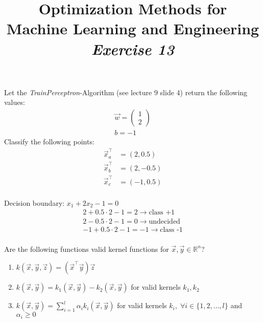 



\author{}
\date{}
\title{Optimization Methods for \\Machine Learning and Engineering\\\vspace{0.5cm}\textit{Exercise 13}}
\maketitle


\setcounter{section}{13}
\setcounter{exercise}{0}


\begin{exercise}[subtitle={Paper}]
Let the \textit{TrainPerceptron}-Algorithm (see lecture 9 slide 4) return the following values:
\begin{align*}
\vec{w} = \begin{pmatrix}
1\\
2
\end{pmatrix}\\
b = -1
\end{align*}
Classify the following points:
\begin{align*}
\vec{x}_a^\top &= (2,0.5)\\
\vec{x}_b^\top &= (2,-0.5)\\
\vec{x}_c^\top &= (-1,0.5)\\
\end{align*}
\end{exercise}

\begin{solution}[print=true]
Decision boundary:
$x_1 + 2x_2 - 1 = 0$
\begin{align*}
2+0.5\cdot 2-1 = 2 \rightarrow \text{class +1}\\
2-0.5\cdot 2-1 = 0 \rightarrow \text{undecided}\\
-1+0.5\cdot 2-1 = -1 \rightarrow \text{class -1}\\
\end{align*}
\end{solution}

\begin{exercise}[subtitle={Paper}]
  Are the following functions valid kernel functions for $\vec x, \vec y \in \mathbb{R}^n$?
\begin{enumerate}[label=\emph{\alph*)}]
  \item $k(\vec x,\vec y,\vec z) = (\vec x^\top \vec y) \vec z$
  \item $k(\vec x,\vec y) = k_1(\vec x,\vec y) - k_2(\vec x,\vec y)$ for valid kernels $k_1, k_2$ 
  \item $k(\vec x,\vec y) = \sum_{i=1}^l \alpha_i k_i(\vec x,\vec y)$ for valid kernels $k_i,\; \forall i \in \{1,2,\dots ,l \}$ and $\alpha_i \geq 0$
  \end{enumerate}
\end{exercise}

